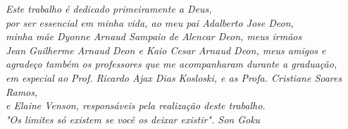 \begin{dedicatoria}
   \vspace*{\fill}
   \centering
   \noindent

   \textit{Este trabalho é dedicado primeiramente a Deus,\\
   por ser essencial em minha vida, ao meu pai Adalberto Jose Deon, \\
   minha mãe Dyonne Arnaud Sampaio de Alencar Deon, meus irmãos \\
   Jean Guilherme Arnaud Deon e Kaio Cesar Arnaud Deon, meus amigos e \\
   agradeço também os professores que me acompanharam durante a graduação, \\
   em especial ao Prof. Ricardo Ajax Dias Kosloski, e as Profa. Cristiane Soares Ramos, \\
   e Elaine Venson, responsáveis pela realização deste trabalho. \\
   "Os limites só existem se você os deixar existir". Son Goku} \vspace*{\fill}
\end{dedicatoria}
